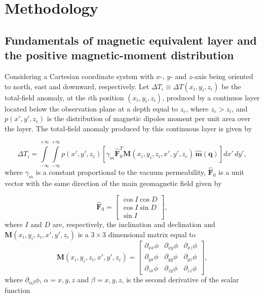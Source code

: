 \section{Methodology}
\label{sec:methodology}

\subsection{Fundamentals of magnetic equivalent layer and the positive magnetic-moment distribution}
\label{subsec:mag_eqlayer}

Considering a Cartesian coordinate system with $x$-, $y$- and $z$-axis being oriented to north, east and downward, respectively. Let $\Delta T_i \equiv \Delta T (x_i,y_i,z_i)$ be the total-field anomaly, at the $i$th position $(x_i,y_i,z_i)$, produced by a continuos layer located below the observation plane at a depth equal to $z_c$, where $z_c > z_i$, and $p(x',y',z_c)$ is the distribution of magnetic dipoles moment per unit area over the layer. The total-field anomaly produced by this continuous layer is given by 

\begin{equation}
\Delta T_i = \int \limits_{-\infty}^{+\infty } \int \limits_{-\infty}^{+\infty }  p(x',y',z_c)  [\gamma_m \hat{\mathbf{F}}_0^T \mathbf{M}(x_i,y_i,z_i,x',y',z_c) \,\hat{\mathbf{m}}(\mathbf{q})] dx' \,dy',
\label{eq:continuous_layer}
\end{equation}
where $\gamma_m$ is a constant proportional to the vacuum permeability, $\hat{\mathbf{F}}_0$ is a unit vector with the same direction of the main geomagnetic field given by

\begin{equation}
	\hat{\mathbf{F}}_0 =
	\left[ \begin{array}{c}
		 \cos I \cos D \\
		 \cos I \sin D \\
		 \sin I     
	\end{array} \right] ,
	\label{eq:main_field}
\end{equation}
where $I$ and $D$ are, respectively, the inclination and declination and $\mathbf{M}(x_i,y_i,z_i,x',y',z_c)$ is a $3 \times 3$ dimensional matrix \citep{oliveirajr_etal_2015} equal to  
\begin{equation}
\mathbf{M}(x_i,y_i,z_i,x',y',z_c) =
\left[ \begin{array}{ccc}
\partial_{xx} \phi & \partial_{xy} \phi &\partial_{xz} \phi \\  \partial_{yx} \phi & \partial_{yy} \phi &\partial_{yz} \phi \\  \partial_{zx} \phi &\partial_{zy}\phi  & \partial_{zz} \phi    
\end{array} \right] ,
\label{eq:H}
\end{equation}
where $\partial_{\alpha \beta} \phi$, $\alpha = x, y, z$ and $\beta = x, y, z$, is the second derivative of the scalar function 

